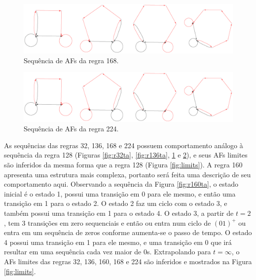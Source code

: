 \documentclass[12pt,a4paper]{article}
\begin{document}
\begin{figure}[H]
\begin{center}
\includegraphics[scale=0.47]{img/Rule168dfa.eps}
\caption{Sequência de AFs da regra 168.}
\label{fig:r168ta}
\end{center}
\end{figure}

\begin{figure}[H]
\begin{center}
\includegraphics[scale=0.47]{img/Rule224dfa.eps}
\caption{Sequência de AFs da regra 224.}
\label{fig:r224ta}
\end{center}
\end{figure}

As sequências das regras 32, 136, 168 e 224 possuem comportamento análogo à
sequência da regra 128 (Figuras \ref{fig:r32ta}, \ref{fig:r136ta}, \ref{fig:r168ta}
e \ref{fig:r224ta}), e seus AFs limites são inferidos da mesma forma que a regra 128 (Figura \ref{fig:limits}).
A regra 160 apresenta uma estrutura mais complexa, portanto será feita uma descrição
de seu comportamento aqui. Observando a sequência da Figura
\ref{fig:r160ta}, o estado inicial é o estado 1, possui uma transição em 0 para ele mesmo, e então
uma transição em 1 para o estado 2. O estado 2 faz um ciclo com o estado 3, e também possui uma
transição em 1 para o estado 4. O estado 3, a partir de $t=2$, tem 3 transições em zero sequenciais
e então ou entra num ciclo de $(01)^+$ ou entra em um sequência de zeros conforme aumenta-se o
passo de tempo. O estado 4 possui uma transição em 1 para ele mesmo, e uma transição em 0 que
irá resultar em uma sequência cada vez maior de 0s. Extrapolando para $t=\infty$,
o AFs limites das regras 32, 136, 160, 168 e 224 são inferidos e mostrados na Figura
\ref{fig:limits}.
\end{document}
